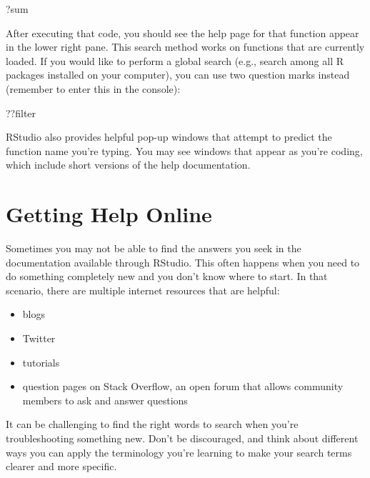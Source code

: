 \documentclass[]{Nemilov}
\newenvironment{Shaded}{\begin{snugshade}}{\end{snugshade}}
\newcommand{\NormalTok}[1]{#1}
\providecommand{\tightlist}{%
  \setlength{\itemsep}{0pt}\setlength{\parskip}{0pt}}
\begin{document}
\begin{Shaded}
\begin{Highlighting}[]
\NormalTok{?sum}
\end{Highlighting}
\end{Shaded}

After executing that code, you should see the help page for that function appear
in the lower right pane. This search method works on functions that are currently
loaded. If you would like to perform a global search (e.g., search among all R
packages installed on your computer), you can use two question marks instead
(remember to enter this in the console):

\begin{Shaded}
\begin{Highlighting}[]
\NormalTok{??filter}
\end{Highlighting}
\end{Shaded}

RStudio also provides helpful pop-up windows that attempt to predict the
function name you're typing. You may see windows that appear as you're coding,
which include short versions of the help documentation.

\hypertarget{r-getting-started-web-help}{%
\section{Getting Help Online}\label{r-getting-started-web-help}}

Sometimes you may not be able to find the answers you seek in the
documentation available through RStudio.
This often happens when you need to do something
completely new and you don't know where to start. In that scenario, there are
multiple internet resources that are helpful:

\begin{itemize}
\tightlist
\item
  blogs
\item
  Twitter
\item
  tutorials
\item
  question pages on Stack Overflow, an open forum that allows community members
  to ask and answer questions
\end{itemize}

It can be challenging to find the right words to search when you're
troubleshooting something new. Don't be discouraged, and think about different
ways you can apply the terminology you're learning to make your search terms
clearer and more specific.
\end{document}
